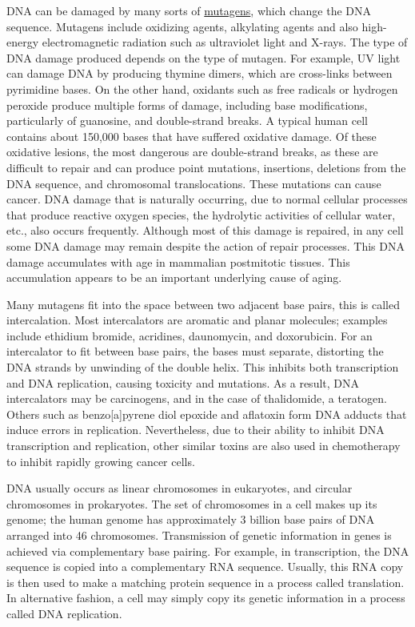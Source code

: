 DNA can be damaged by many sorts of \href{https://en.wikipedia.org/wiki/Mutagen}{mutagens}, which change the DNA sequence. Mutagens include oxidizing agents, alkylating agents and also high-energy electromagnetic radiation such as ultraviolet light and X-rays. The type of DNA damage produced depends on the type of mutagen. For example, UV light can damage DNA by producing thymine dimers, which are cross-links between pyrimidine bases. On the other hand, oxidants such as free radicals or hydrogen peroxide produce multiple forms of damage, including base modifications, particularly of guanosine, and double-strand breaks. A typical human cell contains about 150,000 bases that have suffered oxidative damage. Of these oxidative lesions, the most dangerous are double-strand breaks, as these are difficult to repair and can produce point mutations, insertions, deletions from the DNA sequence, and chromosomal translocations. These mutations can cause cancer. DNA damage that is naturally occurring, due to normal cellular processes that produce reactive oxygen species, the hydrolytic activities of cellular water, etc., also occurs frequently. Although most of this damage is repaired, in any cell some DNA damage may remain despite the action of repair processes. This DNA damage accumulates with age in mammalian postmitotic tissues. This accumulation appears to be an important underlying cause of aging.

Many mutagens fit into the space between two adjacent base pairs, this is called intercalation. Most intercalators are aromatic and planar molecules; examples include ethidium bromide, acridines, daunomycin, and doxorubicin. For an intercalator to fit between base pairs, the bases must separate, distorting the DNA strands by unwinding of the double helix. This inhibits both transcription and DNA replication, causing toxicity and mutations. As a result, DNA intercalators may be carcinogens, and in the case of thalidomide, a teratogen. Others such as benzo{[}a{]}pyrene diol epoxide and aflatoxin form DNA adducts that induce errors in replication. Nevertheless, due to their ability to inhibit DNA transcription and replication, other similar toxins are also used in chemotherapy to inhibit rapidly growing cancer cells.

DNA usually occurs as linear chromosomes in eukaryotes, and circular chromosomes in prokaryotes. The set of chromosomes in a cell makes up its genome; the human genome has approximately 3 billion base pairs of DNA arranged into 46 chromosomes. Transmission of genetic information in genes is achieved via complementary base pairing. For example, in transcription, the DNA sequence is copied into a complementary RNA sequence. Usually, this RNA copy is then used to make a matching protein sequence in a process called translation. In alternative fashion, a cell may simply copy its genetic information in a process called DNA replication.

